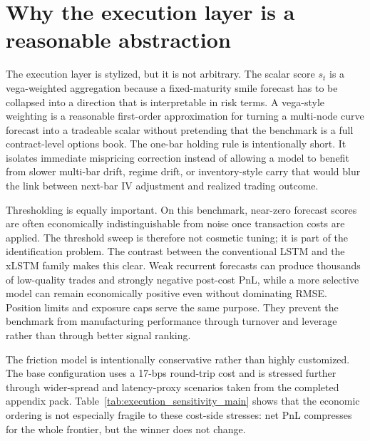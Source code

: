 \documentclass[12pt]{report}
\begin{document}
\section{Why the execution layer is a reasonable abstraction}
The execution layer is stylized, but it is not arbitrary. The scalar score \(s_t\) is a vega-weighted aggregation because a fixed-maturity smile forecast has to be collapsed into a direction that is interpretable in risk terms. A vega-style weighting is a reasonable first-order approximation for turning a multi-node curve forecast into a tradeable scalar without pretending that the benchmark is a full contract-level options book. The one-bar holding rule is intentionally short. It isolates immediate mispricing correction instead of allowing a model to benefit from slower multi-bar drift, regime drift, or inventory-style carry that would blur the link between next-bar IV adjustment and realized trading outcome.

Thresholding is equally important. On this benchmark, near-zero forecast scores are often economically indistinguishable from noise once transaction costs are applied. The threshold sweep is therefore not cosmetic tuning; it is part of the identification problem. The contrast between the conventional LSTM and the xLSTM family makes this clear. Weak recurrent forecasts can produce thousands of low-quality trades and strongly negative post-cost PnL, while a more selective model can remain economically positive even without dominating RMSE. Position limits and exposure caps serve the same purpose. They prevent the benchmark from manufacturing performance through turnover and leverage rather than through better signal ranking.

The friction model is intentionally conservative rather than highly customized. The base configuration uses a 17-bps round-trip cost and is stressed further through wider-spread and latency-proxy scenarios taken from the completed appendix pack. Table~\ref{tab:execution_sensitivity_main} shows that the economic ordering is not especially fragile to these cost-side stresses: net PnL compresses for the whole frontier, but the winner does not change.
\end{document}
